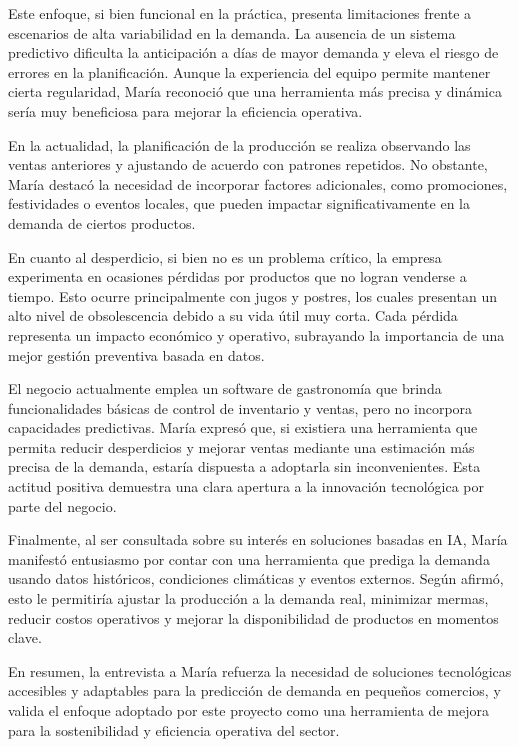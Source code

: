 \indent Este enfoque, si bien funcional en la práctica, presenta limitaciones frente a escenarios de alta variabilidad en la demanda. La ausencia de un sistema predictivo dificulta la anticipación a días de mayor demanda y eleva el riesgo de errores en la planificación. Aunque la experiencia del equipo permite mantener cierta regularidad, María reconoció que una herramienta más precisa y dinámica sería muy beneficiosa para mejorar la eficiencia operativa.

\indent En la actualidad, la planificación de la producción se realiza observando las ventas anteriores y ajustando de acuerdo con patrones repetidos. No obstante, María destacó la necesidad de incorporar factores adicionales, como promociones, festividades o eventos locales, que pueden impactar significativamente en la demanda de ciertos productos.

\indent En cuanto al desperdicio, si bien no es un problema crítico, la empresa experimenta en ocasiones pérdidas por productos que no logran venderse a tiempo. Esto ocurre principalmente con jugos y postres, los cuales presentan un alto nivel de obsolescencia debido a su vida útil muy corta. Cada pérdida representa un impacto económico y operativo, subrayando la importancia de una mejor gestión preventiva basada en datos.

\indent El negocio actualmente emplea un software de gastronomía que brinda funcionalidades básicas de control de inventario y ventas, pero no incorpora capacidades predictivas. María expresó que, si existiera una herramienta que permita reducir desperdicios y mejorar ventas mediante una estimación más precisa de la demanda, estaría dispuesta a adoptarla sin inconvenientes. Esta actitud positiva demuestra una clara apertura a la innovación tecnológica por parte del negocio.

\indent Finalmente, al ser consultada sobre su interés en soluciones basadas en IA, María manifestó entusiasmo por contar con una herramienta que prediga la demanda usando datos históricos, condiciones climáticas y eventos externos. Según afirmó, esto le permitiría ajustar la producción a la demanda real, minimizar mermas, reducir costos operativos y mejorar la disponibilidad de productos en momentos clave.

\indent En resumen, la entrevista a María refuerza la necesidad de soluciones tecnológicas accesibles y adaptables para la predicción de demanda en pequeños comercios, y valida el enfoque adoptado por este proyecto como una herramienta de mejora para la sostenibilidad y eficiencia operativa del sector.


